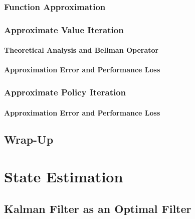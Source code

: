 		\subsection{Function Approximation} %

		\subsection{Approximate Value Iteration} %

			\subsubsection{Theoretical Analysis and Bellman Operator} %

			\subsubsection{Approximation Error and Performance Loss} %

		\subsection{Approximate Policy Iteration} %

			\subsubsection{Approximation Error and Performance Loss} %

	\section{Wrap-Up} %

\chapter{State Estimation} %

	\section{Kalman Filter as an Optimal Filter} %

